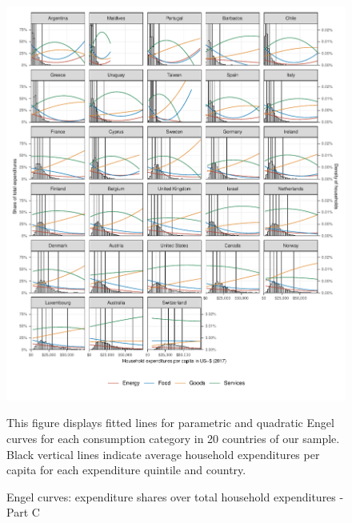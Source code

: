 \documentclass[12pt, a4paper]{article}
\newenvironment{subcaption}
{\strut
\vspace{-5pt}
\begin{minipage}[b]{0.9\textwidth}
  \hspace*{-\parindent}
  \footnotesize}
 {\end{minipage}}
\begin{document}
\begin{figure}[ht!]
  \centering
  \caption{Engel curves: expenditure shares over total household expenditures - Part C} \label{fig:A3}
  \includegraphics{Analysis_Parametric_Engel_Curves/Parametric_EC_0_C}
  \begin{subcaption}
    This figure displays fitted lines for parametric and quadratic Engel curves for each consumption category in 20 countries of our sample. Black vertical lines indicate average household expenditures per capita for each expenditure quintile and country.
  \end{subcaption}

\end{figure}

\clearpage
\end{document}

